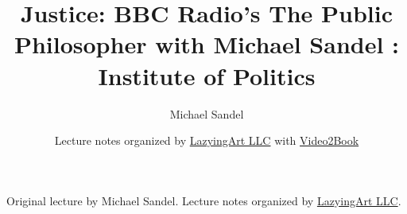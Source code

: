 \documentclass[11pt,oneside]{book}
\begin{document}
\frontmatter
\title{Justice: BBC Radio's The Public Philosopher with Michael Sandel : Institute of Politics}
\author{Michael Sandel}
\date{Lecture notes organized by \href{https://lazying.art}{LazyingArt LLC} with \href{https://github.com/lachlanchen/Video2Book}{Video2Book}}
\maketitle
\begin{center}
\small Original lecture by Michael Sandel. Lecture notes organized by \href{https://lazying.art}{LazyingArt LLC}.
\end{center}
\clearpage
\mainmatter

\end{document}
